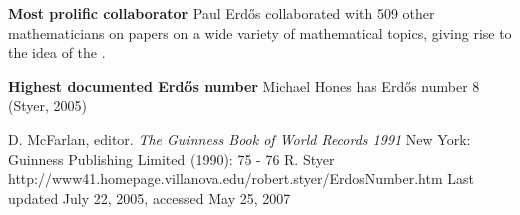 \documentclass[12pt]{article}
\begin{document}
{\bf Most prolific collaborator} Paul Erd\H{o}s collaborated with 509 other mathematicians on papers on a wide variety of mathematical topics, giving rise to the idea of the  .


{\bf Highest documented Erd\H{o}s number} Michael Hones has Erd\H{o}s number 8 (Styer, 2005)

\begin{thebibliography}{2}
 D. McFarlan, editor. {\it The Guinness Book of World Records 1991} New York: Guinness Publishing Limited (1990): 75 - 76
 R. Styer  http://www41.homepage.villanova.edu/robert.styer/ErdosNumber.htm Last updated July 22, 2005, accessed May 25, 2007
\end{thebibliography}

\end{document}
